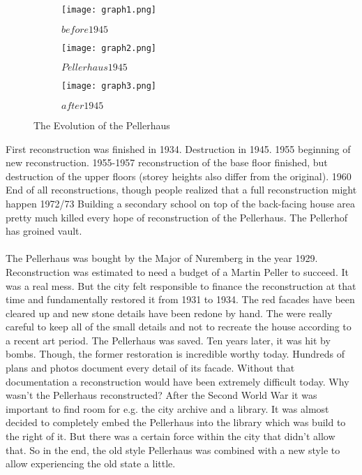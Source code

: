 \begin{figure}[h]
	\centering
	\begin{subfigure}[b]{0.3\textwidth}
		\centering
		\texttt{[image: graph1.png]}
		\caption{$before 1945$}
		\label{fig:pellerhaus_historic}
	\end{subfigure}
	\hfill
	\begin{subfigure}[b]{0.3\textwidth}
		\centering
		\texttt{[image: graph2.png]}
		\caption{$Pellerhaus 1945$}
		\label{fig:pellerhaus_destructed}
	\end{subfigure}
	\hfill
	\begin{subfigure}[b]{0.3\textwidth}
		\centering
		\texttt{[image: graph3.png]}
		\caption{$after 1945$}
		\label{fig:pellerhaus_modern}
	\end{subfigure}
	\caption{The Evolution of the Pellerhaus}
	\label{fig:pellerhaus_states}
\end{figure}

First reconstruction was finished in 1934.
Destruction in 1945.
1955 beginning of new reconstruction.
1955-1957 reconstruction of the base floor finished, but destruction of the upper floors (storey heights also differ from the original).
1960 End of all reconstructions, though people realized that a full reconstruction might happen
1972/73 Building a secondary school on top of the back-facing house area pretty much killed every hope of reconstruction of the Pellerhaus.
The Pellerhof has groined vault.\parencite{afPellerhausMagazin01} \\\\

The Pellerhaus was bought by the Major of Nuremberg in the year 1929. Reconstruction was estimated to need a budget of a Martin Peller to succeed. It was a real mess. But the city felt responsible to finance the reconstruction at that time and fundamentally restored it from 1931 to 1934. The red facades have been cleared up and new stone details have been redone by hand. The were really careful to keep all of the small details and not to recreate the house according to a recent art period. The Pellerhaus was saved. Ten years later, it was hit by bombs. Though, the former restoration is incredible worthy today. Hundreds of plans and photos document every detail of its facade. Without that documentation a reconstruction would have been extremely difficult today.
Why wasn't the Pellerhaus reconstructed?
After the Second World War it was important to find room for e.g. the city archive and a library. It was almost decided to completely embed the Pellerhaus into the library which was build to the right of it. But there was a certain force within the city that didn't allow that. So in the end, the old style Pellerhaus was combined with a new style to allow experiencing the old state a little.\parencite{afPellerhausMagazin02} \\\\


